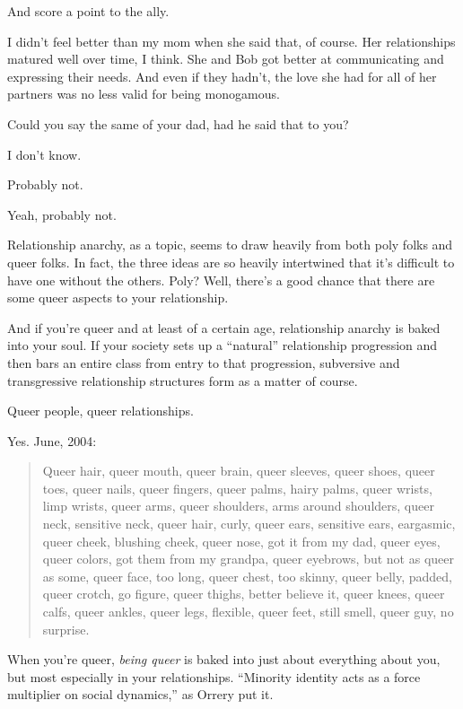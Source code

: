 \begin{leftcolumn}
\begin{ally}
And score a point to the ally.
\end{ally}
I didn't feel better than my mom when she said that, of course. Her relationships matured well over time, I think. She and Bob got better at communicating and expressing their needs. And even if they hadn't, the love she had for all of her partners was no less valid for being monogamous.

\begin{ally}
Could you say the same of your dad, had he said that to you?
\end{ally}
I don't know.

\begin{ally}
Probably not.
\end{ally}
Yeah, probably not.
\newpage

Relationship anarchy, as a topic, seems to draw heavily from both poly folks and queer folks. In fact, the three ideas are so heavily intertwined that it's difficult to have one without the others. Poly? Well, there's a good chance that there are some queer aspects to your relationship.

And if you're queer and at least of a certain age, relationship anarchy is baked into your soul. If your society sets up a ``natural'' relationship progression and then bars an entire class from entry to that progression, subversive and transgressive relationship structures form as a matter of course.

\begin{ally}
Queer people, queer relationships.
\end{ally}
Yes. June, 2004:

\begin{quotation}
Queer hair, queer mouth, queer brain, queer sleeves, queer shoes, queer toes, queer nails, queer fingers, queer palms, hairy palms, queer wrists, limp wrists, queer arms, queer shoulders, arms around shoulders, queer neck, sensitive neck, queer hair, curly, queer ears, sensitive ears, eargasmic, queer cheek, blushing cheek, queer nose, got it from my dad, queer eyes, queer colors, got them from my grandpa, queer eyebrows, but not as queer as some, queer face, too long, queer chest, too skinny, queer belly, padded, queer crotch, go figure, queer thighs, better believe it, queer knees, queer calfs, queer ankles, queer legs, flexible, queer feet, still smell, queer guy, no surprise.
\end{quotation}

When you're queer, \emph{being queer} is baked into just about everything about you, but most especially in your relationships. ``Minority identity acts as a force multiplier on social dynamics,'' as Orrery put it.


\end{leftcolumn}
